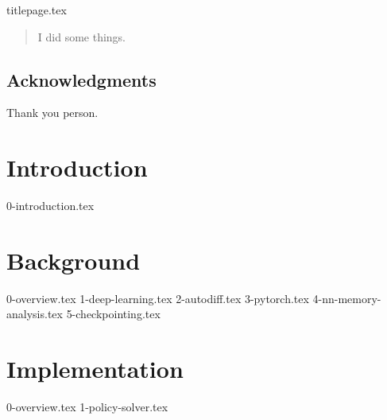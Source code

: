\documentclass[12pt,twoside]{report}
\begin{document}
{titlepage.tex}

\clearpage{\pagestyle{empty}\cleardoublepage}
\setcounter{page}{1}
\pagestyle{fancy}

\begin{abstract}
I did some things.
\end{abstract}

\cleardoublepage
\section*{Acknowledgments}
Thank you person.

\clearpage{\pagestyle{empty}\cleardoublepage}

\tableofcontents
\clearpage{\pagestyle{empty}}

\listoffigures
\clearpage{\pagestyle{empty}}

\listoflistings

\listofalgorithms

\clearpage{\pagestyle{empty}\cleardoublepage}
\setcounter{page}{1}
\fancyhead[LE,RO]{\slshape \rightmark}
\fancyhead[LO,RE]{\slshape \leftmark}

\chapter{Introduction}
{0-introduction.tex}

\chapter{Background}
{0-overview.tex}
{1-deep-learning.tex}
{2-autodiff.tex}
{3-pytorch.tex}
{4-nn-memory-analysis.tex}
{5-checkpointing.tex}

\chapter{Implementation}
{0-overview.tex}
{1-policy-solver.tex}
\end{document}

